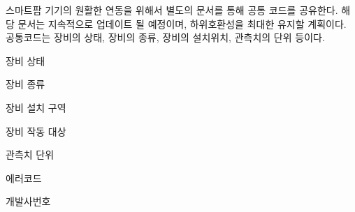 스마트팜 기기의 원활한 연동을 위해서 별도의 문서를 통해 공통 코드를 공유한다. 해당 문서는 지속적으로 업데이트 될 예정이며, 하위호환성을 최대한 유지할 계획이다. 공통코드는 장비의 상태, 장비의 종류, 장비의 설치위치, 관측치의 단위 등이다.


\begin{DoxyItemize}
\item 장비 상태
\item 장비 종류
\item 장비 설치 구역
\item 장비 작동 대상
\item 관측치 단위
\item 에러코드
\item 개발사번호 
\end{DoxyItemize}